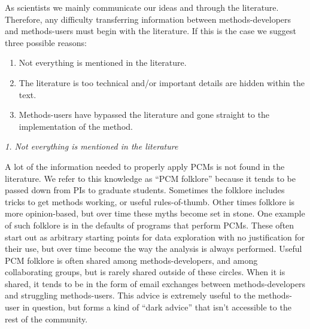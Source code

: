 \documentclass[a4paper,12pt]{article}
\renewcommand{\subsection}[1]{
  \bigskip
  \begin{center}
  \begin{large}
  \normalfont\itshape #1
  \end{large}
  \end{center}
}
\begin{document}
As scientists we mainly communicate our ideas and through the literature. Therefore, any difficulty transferring information between methods-developers and methods-users must begin with the literature. If this is the case we suggest three possible reasons:

\begin{enumerate}
\item Not everything is mentioned in the literature.
\item The literature is too technical and/or important details are hidden within the text.
\item Methods-users have bypassed the literature and gone straight to the implementation of the method.
\end{enumerate}


\subsection{1. Not everything is mentioned in the literature}

A lot of the information needed to properly apply PCMs is not found in the literature. 
We refer to this knowledge as ``PCM folklore'' because it tends to be passed down from PIs to graduate students.
Sometimes the folklore includes tricks to get methods working, or useful rules-of-thumb. 
Other times folklore is more opinion-based, but over time these myths become set in stone. 
One example of such folklore is in the defaults of programs that perform PCMs. 
These often start out as arbitrary starting points for data exploration with no justification for their use, but over time become the way the analysis is always performed.
Useful PCM folklore is often shared among methods-developers, and among collaborating groups, but is rarely shared outside of these circles. 
When it is shared, it tends to be in the form of email exchanges between methods-developers and struggling methods-users.
This advice is extremely useful to the methods-user in question, but forms a kind of ``dark advice'' that isn't accessible to the rest of the community.\\
\end{document}
